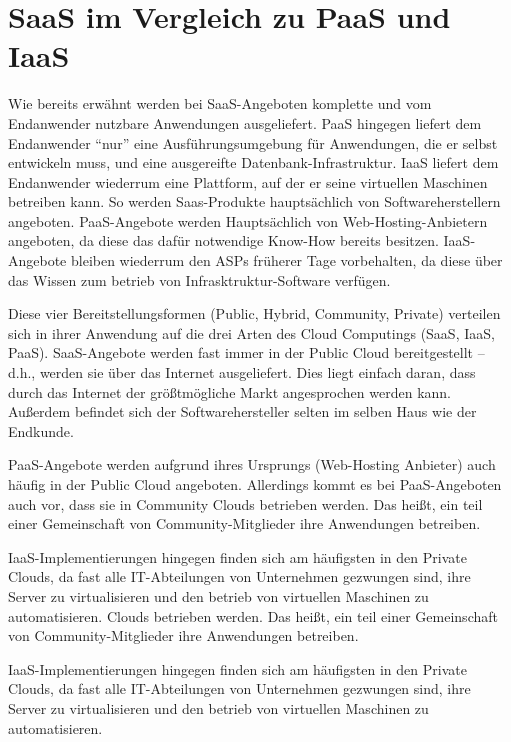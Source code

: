 \documentclass[a4paper,10pt]{article}
\begin{document}
\section{SaaS im Vergleich zu PaaS und IaaS}
Wie bereits erwähnt werden bei SaaS-Angeboten komplette und vom Endanwender nutzbare Anwendungen ausgeliefert. PaaS hingegen liefert dem Endanwender ``nur'' eine Ausführungsumgebung für Anwendungen, die er selbst entwickeln muss, und eine ausgereifte Datenbank-Infrastruktur. IaaS liefert dem Endanwender wiederrum eine Plattform, auf der er seine virtuellen Maschinen betreiben kann. So werden Saas-Produkte hauptsächlich von Softwareherstellern angeboten. PaaS-Angebote werden Hauptsächlich von Web-Hosting-Anbietern angeboten, da diese das dafür notwendige Know-How bereits besitzen. IaaS-Angebote bleiben wiederrum den ASPs früherer Tage vorbehalten, da diese über das Wissen zum betrieb von Infrasktruktur-Software verfügen.


\vspace{3mm}
Diese vier Bereitstellungsformen (Public, Hybrid, Community, Private) verteilen sich in ihrer Anwendung auf die drei Arten des Cloud Computings (SaaS, IaaS, PaaS). SaaS-Angebote werden fast immer in der Public Cloud bereitgestellt -- d.h., werden sie über das Internet ausgeliefert. Dies liegt einfach daran, dass durch das Internet der größtmögliche Markt angesprochen werden kann. Außerdem befindet sich der Softwarehersteller selten im selben Haus wie der Endkunde.


\vspace{3mm}
PaaS-Angebote werden aufgrund ihres Ursprungs (Web-Hosting Anbieter) auch häufig in der Public Cloud angeboten. Allerdings kommt es bei PaaS-Angeboten auch vor, dass sie in Community Clouds betrieben werden. Das heißt, ein teil einer Gemeinschaft von Community-Mitglieder ihre Anwendungen betreiben.


\vspace{3mm}
IaaS-Implementierungen hingegen finden sich am häufigsten in den Private Clouds, da fast alle IT-Abteilungen von Unternehmen gezwungen sind, ihre Server zu virtualisieren und den betrieb von virtuellen Maschinen zu automatisieren. Clouds betrieben werden. Das heißt, ein teil einer Gemeinschaft von Community-Mitglieder ihre Anwendungen betreiben.


\vspace{3mm}
IaaS-Implementierungen hingegen finden sich am häufigsten in den Private Clouds, da fast alle IT-Abteilungen von Unternehmen gezwungen sind, ihre Server zu virtualisieren und den betrieb von virtuellen Maschinen zu automatisieren.
\end{document}
